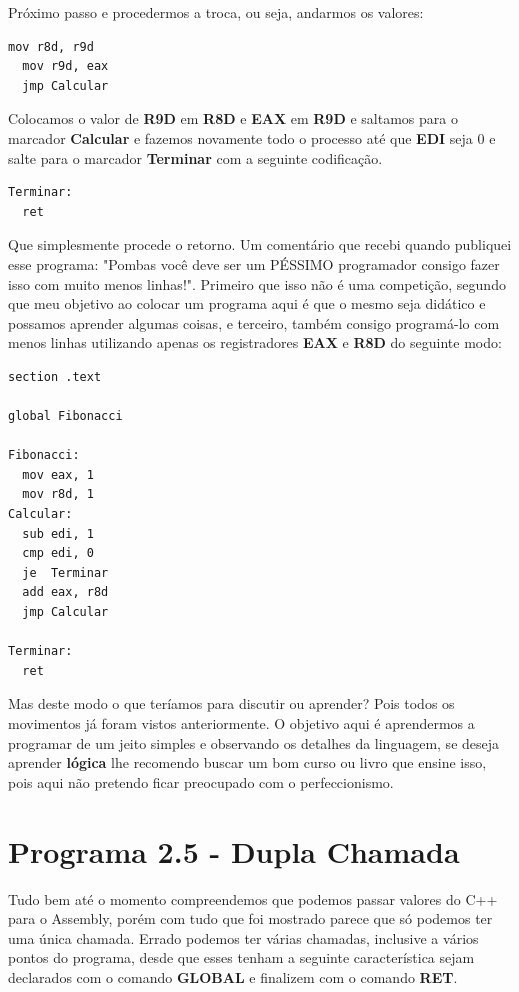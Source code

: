 Próximo passo e procedermos a troca, ou seja, andarmos os valores:
\begin{lstlisting}[]
  mov r8d, r9d
  mov r9d, eax
  jmp Calcular
\end{lstlisting}

Colocamos o valor de \textbf{R9D} em \textbf{R8D} e \textbf{EAX} em \textbf{R9D} e saltamos para o marcador \textbf{Calcular} e fazemos novamente todo o processo até que \textbf{EDI} seja 0 e salte para o marcador \textbf{Terminar} com a seguinte codificação.
\begin{lstlisting}[]
Terminar:
  ret	
\end{lstlisting}

Que simplesmente procede o retorno. Um comentário que recebi quando publiquei esse programa: "Pombas você deve ser um PÉSSIMO programador consigo fazer isso com muito menos linhas!". Primeiro que isso não é uma competição, segundo que meu objetivo ao colocar um programa aqui é que o mesmo seja didático e possamos aprender algumas coisas, e terceiro, também consigo programá-lo com menos linhas utilizando apenas os registradores \textbf{EAX} e \textbf{R8D} do seguinte modo:
\begin{lstlisting}[]
section .text

global Fibonacci

Fibonacci:
  mov eax, 1
  mov r8d, 1
Calcular:
  sub edi, 1 
  cmp edi, 0
  je  Terminar
  add eax, r8d
  jmp Calcular

Terminar:
  ret
\end{lstlisting}

Mas deste modo o que teríamos para discutir ou aprender? Pois todos os movimentos já foram vistos anteriormente. O objetivo aqui é aprendermos a programar de um jeito simples e observando os detalhes da linguagem, se deseja aprender \textbf{lógica} lhe recomendo buscar um bom curso ou livro que ensine isso, pois aqui não pretendo ficar preocupado com o perfeccionismo.

\section{Programa 2.5 - Dupla Chamada}
Tudo bem até o momento compreendemos que podemos passar valores do C++ para o Assembly, porém com tudo que foi mostrado parece que só podemos ter uma única chamada. Errado podemos ter várias chamadas, inclusive a vários pontos do programa, desde que esses tenham a seguinte característica sejam declarados com o comando \textbf{GLOBAL} e finalizem com o comando \textbf{RET}. 

